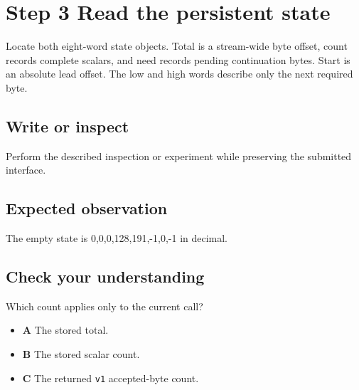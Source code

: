 \section{Step 3 Read the persistent state}\label{utf8-s03}

Locate both eight-word state objects. Total is a stream-wide byte offset, count records complete scalars, and need records pending continuation bytes. Start is an absolute lead offset. The low and high words describe only the next required byte.

\subsection{Write or inspect}
Perform the described inspection or experiment while preserving the submitted interface.

\subsection{Expected observation}
The empty state is 0,0,0,128,191,-1,0,-1 in decimal.

\subsection{Check your understanding}
Which count applies only to the current call?

\begin{itemize}
  \item \textbf{A} The stored total.
  \item \textbf{B} The stored scalar count.
  \item \textbf{C} The returned \texttt{v1} accepted-byte count.
\end{itemize}
